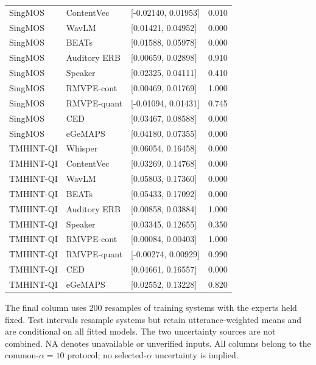 \begin{longtable}{lllr}
SingMOS & ContentVec & [-0.02140, 0.01953] & 0.010 \\
SingMOS & WavLM & [0.01421, 0.04952] & 0.000 \\
SingMOS & BEATs & [0.01588, 0.05978] & 0.000 \\
SingMOS & Auditory ERB & [0.00659, 0.02898] & 0.910 \\
SingMOS & Speaker & [0.02325, 0.04111] & 0.410 \\
SingMOS & RMVPE-cont & [0.00469, 0.01769] & 1.000 \\
SingMOS & RMVPE-quant & [-0.01094, 0.01431] & 0.745 \\
SingMOS & CED & [0.03467, 0.08588] & 0.000 \\
SingMOS & eGeMAPS & [0.04180, 0.07355] & 0.000 \\
TMHINT-QI & Whisper & [0.06054, 0.16458] & 0.000 \\
TMHINT-QI & ContentVec & [0.03269, 0.14768] & 0.000 \\
TMHINT-QI & WavLM & [0.05803, 0.17360] & 0.000 \\
TMHINT-QI & BEATs & [0.05433, 0.17092] & 0.000 \\
TMHINT-QI & Auditory ERB & [0.00858, 0.03884] & 1.000 \\
TMHINT-QI & Speaker & [0.03345, 0.12655] & 0.350 \\
TMHINT-QI & RMVPE-cont & [0.00084, 0.00403] & 1.000 \\
TMHINT-QI & RMVPE-quant & [-0.00274, 0.00929] & 0.990 \\
TMHINT-QI & CED & [0.04661, 0.16557] & 0.000 \\
TMHINT-QI & eGeMAPS & [0.02552, 0.13228] & 0.820 \\
\end{longtable}
\noindent The final column uses 200 resamples of training systems with the experts held fixed. Test intervals resample systems but retain utterance-weighted means and are conditional on all fitted models. The two uncertainty sources are not combined. NA denotes unavailable or unverified inputs. All columns belong to the common-$\alpha=10$ protocol; no selected-$\alpha$ uncertainty is implied.
\endgroup
